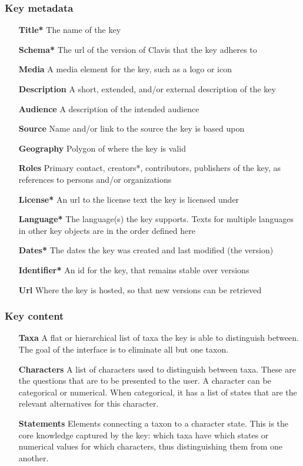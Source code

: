 \documentclass[10pt,letterpaper]{article}
\begin{document}
\subsubsection*{
Key metadata
}
\begin{itemize}
\item[\textbf{Title*}]
The name of the key
\item[\textbf{Schema*}]
The url of the version of Clavis that the key adheres to
\item[\textbf{Media}]
A media element for the key, such as a logo or icon
\item[\textbf{Description}]
A short, extended, and/or external description of the key
\item[\textbf{Audience}]
A description of the intended audience
\item[\textbf{Source}]
Name and/or link to the source the key is based upon
\item[\textbf{Geography}]
Polygon of where the key is valid
\item[\textbf{Roles}]
Primary contact, creators*, contributors, publishers of the key, as references to persons and/or organizations
\item[\textbf{License*}]
An url to the license text the key is licensed under
\item[\textbf{Language*}]
The language(s) the key supports. Texts for multiple languages in other key objects are in the order defined here
\item[\textbf{Dates*}]
The dates the key was created and last modified (the version)
\item[\textbf{Identifier*}]
An id for the key, that remains stable over versions
\item[\textbf{Url}]
Where the key is hosted, so that new versions can be retrieved
\end{itemize}
\subsubsection*{
Key content
}
\begin{itemize}
\item[\textbf{Taxa}]
A flat or hierarchical list of taxa the key is able to distinguish between. The goal of the interface is to eliminate all but one taxon.
\item[\textbf{Characters}]
A list of characters used to distinguish between taxa. These are the questions that are to be presented to the user. A character can be categorical or numerical. When categorical, it has a list of states that are the relevant alternatives for this character.
\item[\textbf{Statements}]
Elements connecting a taxon to a character state. This is the core knowledge captured by the key: which taxa have which states or numerical values for which characters, thus distinguishing them from one another.
\end{itemize}
\end{document}
